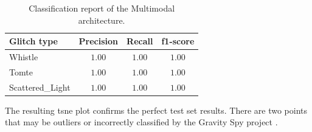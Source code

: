 \begin{table}[ht]
\centering
    \begin{tabular}{|l|c c c|}
    \hline
    \textbf{Glitch type} & \textbf{Precision} & \textbf{Recall} & \textbf{f1-score} \\ \hline
    Whistle & $1.00$ & $1.00$ & $1.00$ \\
    Tomte & $1.00$ & $1.00$ & $1.00$ \\
    Scattered\_Light & $1.00$ & $1.00$ & $1.00$ \\
    \hline
    \end{tabular}
    \caption{Classification report of the Multimodal architecture.}
    \label{tbl:RQ3_class_report_multimodal}
\end{table}

The resulting \acrshort{tsne} plot confirms the perfect test set results. There are two points that may be outliers or incorrectly classified by the Gravity Spy project \citep{zevin2017gravity}. 

